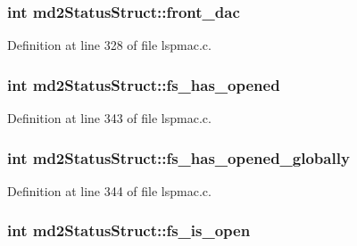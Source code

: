 \hypertarget{structmd2StatusStruct_a3be73c48b09190241a2bcb801af5b97c}{
\subsubsection[{front\-\_\-dac}]{\setlength{\rightskip}{0pt plus 5cm}int md2\-Status\-Struct\-::front\-\_\-dac}}\label{structmd2StatusStruct_a3be73c48b09190241a2bcb801af5b97c}


Definition at line 328 of file lspmac.\-c.

\hypertarget{structmd2StatusStruct_ab961c2ba24a1a8c95a88dec25319e712}{
\subsubsection[{fs\-\_\-has\-\_\-opened}]{\setlength{\rightskip}{0pt plus 5cm}int md2\-Status\-Struct\-::fs\-\_\-has\-\_\-opened}}\label{structmd2StatusStruct_ab961c2ba24a1a8c95a88dec25319e712}


Definition at line 343 of file lspmac.\-c.

\hypertarget{structmd2StatusStruct_ac95696b7ed35ccfdfb6aeeee879bdb65}{
\subsubsection[{fs\-\_\-has\-\_\-opened\-\_\-globally}]{\setlength{\rightskip}{0pt plus 5cm}int md2\-Status\-Struct\-::fs\-\_\-has\-\_\-opened\-\_\-globally}}\label{structmd2StatusStruct_ac95696b7ed35ccfdfb6aeeee879bdb65}


Definition at line 344 of file lspmac.\-c.

\hypertarget{structmd2StatusStruct_aca3722c109e6646bd41fb269a32261f2}{
\subsubsection[{fs\-\_\-is\-\_\-open}]{\setlength{\rightskip}{0pt plus 5cm}int md2\-Status\-Struct\-::fs\-\_\-is\-\_\-open}}\label{structmd2StatusStruct_aca3722c109e6646bd41fb269a32261f2}


